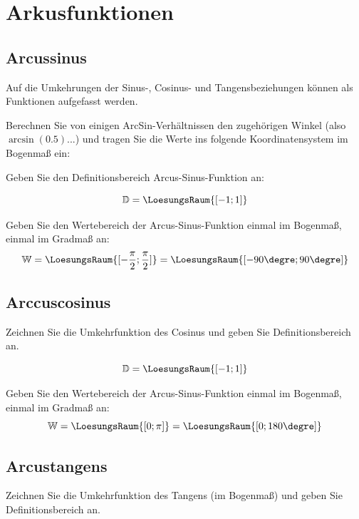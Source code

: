 
\section{Arkusfunktionen}



\subsection{Arcussinus}
Auf die Umkehrungen der Sinus-, Cosinus- und Tangensbeziehungen können
als Funktionen aufgefasst werden.

Berechnen Sie von einigen ArcSin-Verhältnissen den zugehörigen Winkel
(also \zB $\arcsin(0.5)$...) und tragen Sie die Werte ins folgende
Koordinatensystem im Bogenmaß ein:


Geben Sie den Definitionsbereich Arcus-Sinus-Funktion an:

$$\mathbb{D} = \LoesungsRaum{[-1; 1]}$$

Geben Sie den Wertebereich der Arcus-Sinus-Funktion einmal im Bogenmaß,
einmal im Gradmaß an:
$$\mathbb{W} = \LoesungsRaum{[-\frac{\pi}{2}; \frac{\pi}{2}]}  =  \LoesungsRaum{[-90\degre; 90\degre]}$$
\newpage

\subsection{Arccuscosinus}
Zeichnen Sie die Umkehrfunktion des Cosinus und geben Sie Definitionsbereich an.



$$\mathbb{D} = \LoesungsRaum{[-1; 1]}$$

Geben Sie den Wertebereich der Arcus-Sinus-Funktion einmal im Bogenmaß,
einmal im Gradmaß an:
$$\mathbb{W} = \LoesungsRaum{[0; \pi]}  =  \LoesungsRaum{[0; 180\degre]}$$
\newpage


\subsection{Arcustangens}
Zeichnen Sie die Umkehrfunktion des Tangens (im Bogenmaß) und geben Sie Definitionsbereich an.

